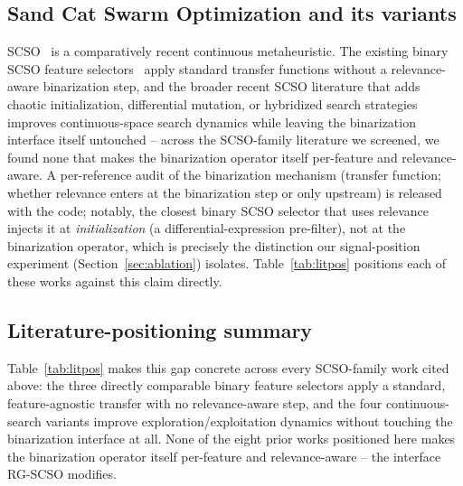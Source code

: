 \documentclass[preprint,3p,times]{elsarticle}
\begin{document}
\subsection{Sand Cat Swarm Optimization and its variants}
SCSO~\cite{scso} is a comparatively recent continuous metaheuristic. The
existing binary SCSO feature selectors~\cite{bscso,scsofs2,scsofs3} apply
standard transfer functions without a relevance-aware binarization step, and
the broader recent SCSO literature that adds chaotic initialization,
differential mutation, or hybridized search
strategies~\cite{imscso2024,mescso2025,scsolensobl2024,improvedscso2024}
improves continuous-space search dynamics while leaving the binarization
interface itself untouched -- across the SCSO-family literature we screened,
we found none that makes
the binarization operator itself per-feature and relevance-aware. A
per-reference audit of the binarization mechanism (transfer function;
whether relevance enters at the binarization step or only upstream) is
released with the code; notably, the closest binary SCSO selector that uses
relevance injects it at \emph{initialization} (a differential-expression
pre-filter), not at the binarization operator, which is precisely the
distinction our signal-position experiment (Section~\ref{sec:ablation})
isolates. Table~\ref{tab:litpos} positions each of these works against
this claim directly.

\subsection{Literature-positioning summary}
Table~\ref{tab:litpos} makes this gap concrete across every SCSO-family
work cited above: the three directly comparable binary feature selectors
apply a standard, feature-agnostic transfer with no relevance-aware step,
and the four continuous-search variants improve exploration/exploitation
dynamics without touching the binarization interface at all. None of the
eight prior works positioned here makes the binarization operator itself
per-feature and relevance-aware -- the interface RG-SCSO modifies.
\end{document}
